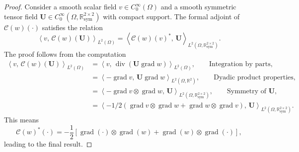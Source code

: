 \documentclass{ifacconf}
\DeclareMathOperator*{\grad}{grad}
\renewcommand{\div}{\operatorname{div}}
\newcommand{\bbR}{\mathbb{R}}
\newcommand{\inner}[3][]{\ensuremath{\left\langle #2, \, #3 \right\rangle_{#1}}}
\newtheorem{proof}{Proof}
\begin{document}
\begin{proof}
	Consider a smooth scalar field  $v \in C^\infty_0(\Omega)$ and a smooth symmetric tensor field $\bm{U} \in C^\infty_0(\Omega, \bbR^{2\times 2}_{\text{sym}})$ with compact support. The formal adjoint of $\mathcal{C}(w)(\cdot)$ satisfies the relation
	\begin{equation}
		\inner[L^2(\Omega)]{v}{\mathcal{C}(w)(\bm{U})} = \inner[L^2(\Omega, \bbR^{2\times 2}_{\text{sym}})]{\mathcal{C}(w)(v)^*}{\bm{U}}.
	\end{equation}
	The proof follows from the computation
	\begin{equation}
		\begin{aligned}
			\inner[L^2(\Omega)]{v}{\mathcal{C}(w)(\bm{U})} &= \inner[L^2(\Omega)]{v}{\div(\bm{U} \grad w)}, \qquad \text{Integration by parts,}\\
			&= \inner[L^2(\Omega, \bbR^2)]{-\grad v}{\bm{U} \grad w}, \qquad \text{Dyadic product properties,}\\
			&= \inner[L^2(\Omega, \bbR^{2\times 2}_{\text{sym}})]{-\grad v \otimes \grad w}{\bm{U}}, \qquad \text{Symmetry of $\bm{U}$,}\\
			&= \inner[L^2(\Omega, \bbR^{2\times 2}_{\text{sym}})]{-1/2(\grad v \otimes \grad w + \grad w \otimes \grad v)}{\bm{U}}.
		\end{aligned} 
	\end{equation}
	This means
	\begin{equation}
		\mathcal{C}(w)^*(\cdot) = -\frac{1}{2} \left[\grad (\cdot) \otimes \grad(w) + \grad(w) \otimes \grad(\cdot) \right],
	\end{equation}
	leading to the final result.
\end{proof}
\end{document}
